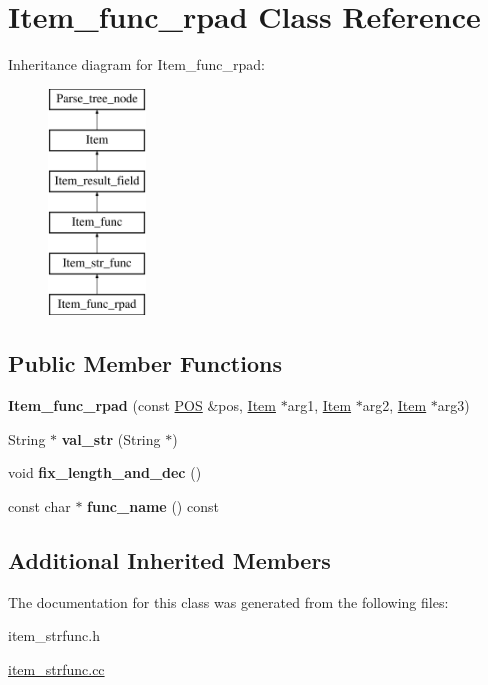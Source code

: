 \hypertarget{classItem__func__rpad}{}\section{Item\+\_\+func\+\_\+rpad Class Reference}
\label{classItem__func__rpad}
Inheritance diagram for Item\+\_\+func\+\_\+rpad\+:\begin{figure}[H]
\begin{center}
\leavevmode
\includegraphics[height=6.000000cm]{classItem__func__rpad}
\end{center}
\end{figure}
\subsection*{Public Member Functions}
\begin{DoxyCompactItemize}
\item 
\mbox{\label{classItem__func__rpad_a2793ce8961ed3fd62fab07b63f88c317}} 
{\bfseries Item\+\_\+func\+\_\+rpad} (const \mbox{\hyperlink{structYYLTYPE}{P\+OS}} \&pos, \mbox{\hyperlink{classItem}{Item}} $\ast$arg1, \mbox{\hyperlink{classItem}{Item}} $\ast$arg2, \mbox{\hyperlink{classItem}{Item}} $\ast$arg3)
\item 
\mbox{\label{classItem__func__rpad_a221f90b3b2c77d18627db8d7d59b61ba}} 
String $\ast$ {\bfseries val\+\_\+str} (String $\ast$)
\item 
\mbox{\label{classItem__func__rpad_a14f3396807a0d4ec782dbf6cb1b0f152}} 
void {\bfseries fix\+\_\+length\+\_\+and\+\_\+dec} ()
\item 
\mbox{\label{classItem__func__rpad_af310c2f2913c9126d49797903db6d89d}} 
const char $\ast$ {\bfseries func\+\_\+name} () const
\end{DoxyCompactItemize}
\subsection*{Additional Inherited Members}


The documentation for this class was generated from the following files\+:\begin{DoxyCompactItemize}
\item 
item\+\_\+strfunc.\+h\item 
\mbox{\hyperlink{item__strfunc_8cc}{item\+\_\+strfunc.\+cc}}\end{DoxyCompactItemize}
